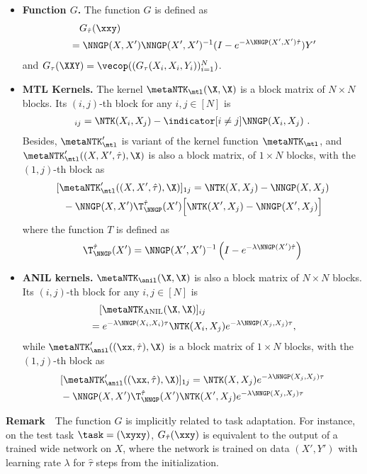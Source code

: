 \documentclass{article}
\begin{document}
\begin{lemma}
\begin{itemize}[leftmargin=*,align=left]
    \item \textbf{Function $G$.} The function $G$ is defined as
    \begin{align}
     &\quad G_{\hat\tau}(\xxy) \nonumber\\
     &=\NNGP(X,X')  \NNGP(X',X')^{-1} (I-e^{-\lambda \NNGP(X',X') \hat\tau}) Y'\nonumber
    \end{align}
    and $G_{\tau}(\XXY) = \vecop((G_{\tau}(X_i,X_i,Y_i))_{i=1}^N)$.
    \item \textbf{MTL Kernels.} The kernel $\metaNTK_\mtl(\X,\X)$ is a block matrix of $N\times N$ blocks. Its $(i,j)$-th block for any $i,j\in[N]$ is
        \begin{align}
            [\metaNTK_\mtl(\X,\X)]_{ij} = \NTK (X_i,X_j) - \indicator [i\neq j] \NNGP(X_i,X_j)~. \nonumber
        \end{align}
        Besides, $\metaNTK_\mtl'$ is variant of the kernel function $\metaNTK_\mtl$, and $\metaNTK_\mtl'((X,X',\hat\tau),\X)$ is also a block matrix, of $1 \times N$ blocks, with the $(1,j)$-th block as
        \begin{align*}
            & [\metaNTK_\mtl'((X,X',\hat\tau),\X)]_{1j} =
            \NTK(X,X_j) - \NNGP(X,X_j)\nonumber \\ 
            &~~ - \NNGP(X,X')\T_{\NNGP}^{\hat\tau}(X') \Big[\NTK(X',X_j) - \NNGP(X',X_j)\Big] 
\end{align*}
        where the function $T$ is defined as
        \begin{equation}\label{eq:T}
            \T_{\NNGP}^{\hat\tau}(X') = \NNGP(X',X')^{-1}\left(I - e^{-\lambda \NNGP(X')\hat\tau}\right)
        \end{equation}
    \item \textbf{ANIL kernels.} $\metaNTK_\anil(\X,\X)$ is also a block matrix of $N\times N$ blocks. Its $(i,j)$-th block for any $i,j\in[N]$ is
    \begin{align*}
        &\quad [\metaNTK_\mathrm{ANIL}(\X,\X)]_{ij} \nonumber\\
        &= e^{-\lambda \NNGP(X_i,X_i)\tau} \NTK(X_i,X_j) e^{-\lambda \NNGP(X_j,X_j)\tau},
\end{align*}
    while $\metaNTK_\anil'((\xx,\hat\tau),\X)$ is a block matrix of $1 \times N$ blocks, with the $(1,j)$-th block as 
    \begin{align*}
        & [\metaNTK_\anil'((\xx,\hat\tau),\X)]_{1j} =\NTK(X,X_j)e^{-\lambda \NNGP(X_j,X_j) \tau}  \nonumber\\
        & - \NNGP(X,X') \T_{\NNGP}^{\hat\tau}(X') \NTK(X',X_j)e^{-\lambda \NNGP(X_j,X_j) \tau} 
    \end{align*}
    \end{itemize}
\end{lemma}
\textbf{Remark}~~The function $G$ is implicitly related to task adaptation. For instance, on the test task $\task=(\xyxy)$, $G_{\hat\tau}(\xxy)$ is equivalent to the output of a trained wide network on $X$, where the network is trained on data $(X',Y')$ with learning rate $\lambda$ for $\hat\tau$ steps from the initialization. 
\end{document}

